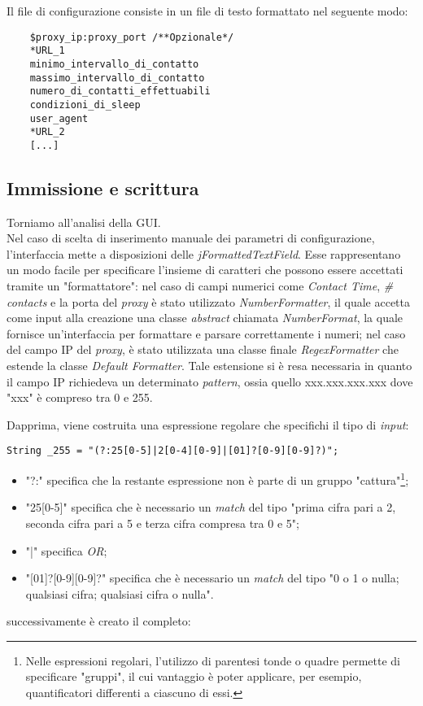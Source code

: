 Il file di configurazione consiste in un file di testo formattato nel seguente modo:

\vspace{0.5cm}
\begin{lstlisting}
	$proxy_ip:proxy_port /**Opzionale*/
	*URL_1
	minimo_intervallo_di_contatto
	massimo_intervallo_di_contatto
	numero_di_contatti_effettuabili
	condizioni_di_sleep
	user_agent
	*URL_2
	[...]
\end{lstlisting}

\subsection{Immissione e scrittura}
Torniamo all'analisi della GUI.\\

Nel caso di scelta di inserimento manuale dei parametri di configurazione, l'interfaccia mette a disposizioni delle \textit{jFormattedTextField}. Esse rappresentano un modo facile per specificare l'insieme di caratteri che possono essere accettati tramite un "formattatore": nel caso di campi numerici come \textit{Contact Time}, \textit{\# contacts} e la porta del \textit{proxy} \`{e} stato utilizzato \textit{NumberFormatter}, il quale accetta come input alla creazione una classe \textit{abstract} chiamata \textit{NumberFormat}, la quale fornisce un'interfaccia per formattare e parsare correttamente i numeri; nel caso del campo IP del \textit{proxy}, \`{e} stato utilizzata una classe finale \textit{RegexFormatter} che estende la classe \textit{Default Formatter}. Tale estensione si \`{e} resa necessaria in quanto il campo IP richiedeva un determinato \textit{pattern}, ossia quello xxx.xxx.xxx.xxx dove "xxx" è compreso tra 0 e 255.

Dapprima, viene costruita una espressione regolare che specifichi il tipo di \textit{input}:

\vspace{0.5cm}
\begin{lstlisting}
String _255 = "(?:25[0-5]|2[0-4][0-9]|[01]?[0-9][0-9]?)";
\end{lstlisting}

\begin{itemize}
	\item "?:" specifica che la restante espressione non \`{e} parte di un gruppo "cattura"\footnote{Nelle espressioni regolari, l'utilizzo di parentesi tonde o quadre permette di specificare "gruppi", il cui vantaggio \`{e} poter applicare, per esempio, quantificatori differenti a ciascuno di essi.};
	\item "25[0-5]" specifica che \`{e} necessario un \textit{match} del tipo "prima cifra pari a 2, seconda cifra pari a 5 e terza cifra compresa tra 0 e 5";
	\item "|" specifica \textit{OR};
	\item "[01]?[0-9][0-9]?" specifica che \`{e} necessario un \textit{match} del tipo "0 o 1 o nulla; qualsiasi cifra; qualsiasi cifra o nulla".
\end{itemize}
successivamente \`{e} creato il  completo:


